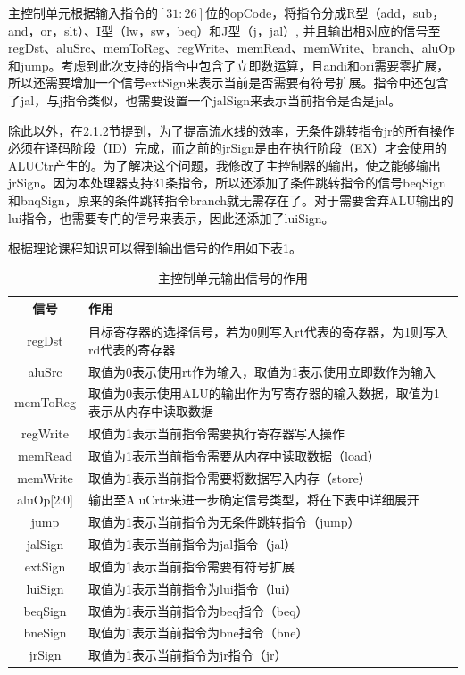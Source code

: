 主控制单元根据输入指令的$[31 :26]$位的opCode，将指令分成R型（add，sub，and，or，slt）、I型（lw，sw，beq）和J型（j，jal）,
并且输出相对应的信号至regDst、aluSrc、memToReg、regWrite、memRead、memWrite、branch、aluOp和jump。考虑到此次支持的指令中包含了立即数运算，且andi和ori需要零扩展，所以还需要增加一个信号extSign来表示当前是否需要有符号扩展。指令中还包含了jal，与j指令类似，也需要设置一个jalSign来表示当前指令是否是jal。

除此以外，在2.1.2节提到，为了提高流水线的效率，无条件跳转指令jr的所有操作必须在译码阶段（ID）完成，而之前的jrSign是由在执行阶段（EX）才会使用的ALUCtr产生的。为了解决这个问题，我修改了主控制器的输出，使之能够输出jrSign。因为本处理器支持31条指令，所以还添加了条件跳转指令的信号beqSign和bnqSign，原来的条件跳转指令branch就无需存在了。对于需要舍弃ALU输出的lui指令，也需要专门的信号来表示，因此还添加了luiSign。

根据理论课程知识可以得到输出信号的作用如下表\ref{1}。

\begin{table}[H]
    \centering
    \begin{tabular}{c|p{12cm}}
    \hline
        信号&作用  \\
        \hline
        regDst &目标寄存器的选择信号，若为0则写入rt代表的寄存器，为1则写入rd代表的寄存器 \\
        aluSrc & 取值为0表示使用rt作为输入，取值为1表示使用立即数作为输入\\
        memToReg & 取值为0表示使用ALU的输出作为写寄存器的输入数据，取值为1表示从内存中读取数据\\
        regWrite & 取值为1表示当前指令需要执行寄存器写入操作\\
        memRead & 取值为1表示当前指令需要从内存中读取数据（load）\\
        memWrite & 取值为1表示当前指令需要将数据写入内存（store）\\
        aluOp[2:0] & 输出至AluCrtr来进一步确定信号类型，将在下表中详细展开\\
        jump & 取值为1表示当前指令为无条件跳转指令（jump）\\
        jalSign & 取值为1表示当前指令为jal指令（jal）\\
        extSign & 取值为1表示当前指令需要有符号扩展\\
        luiSign & 取值为1表示当前指令为lui指令（lui）\\
        beqSign & 取值为1表示当前指令为beq指令（beq）\\
        bneSign & 取值为1表示当前指令为bne指令（bne）\\
        jrSign & 取值为1表示当前指令为jr指令（jr）\\
        \hline
    \end{tabular}
    \caption{主控制单元输出信号的作用}
    \label{1}
\end{table}

